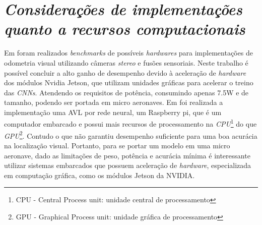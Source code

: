 \section{\textit{ Considerações de implementações quanto a recursos computacionais}}\label{sec:Cap2_trabalhos}


Em \cite{jeon2021run} foram realizados \textit{benchmarks} de possíveis \textit{hardwares} para implementações de odometria visual utilizando câmeras \textit{stereo} e fusões sensoriais. Neste trabalho é possível concluir a alto ganho de desempenho devido à aceleração de \textit{hardware} dos módulos Nvidia Jetson, que utilizam unidades gráficas para acelerar o treino das \textit{CNNs}. Atendendo os requisitos de potência, consumindo apenas 7.5W e de tamanho, podendo ser portada em micro aeronaves.  Em \cite{Shiguemori2016Embedded} foi realizada a implementação uma AVL por rede neural, um Raspberry pi, que é um computador embarcado e possui mais recursos de processamento na \textit{CPU}\footnote{CPU - Central Process unit: unidade central de processamento} do que \textit{GPU}\footnote{GPU - Graphical Process unit: unidade gráfica de processamento}. Contudo  o que não garantiu desempenho suficiente para uma boa acurácia na localização visual. Portanto, para se portar um modelo em uma micro aeronave, dado as limitações de peso, potência e acurácia mínima é interessante utilizar sistemas embarcados que possuem aceleração de \textit{hardware}, especializada em computação gráfica, como os módulos Jetson da NVIDIA.



